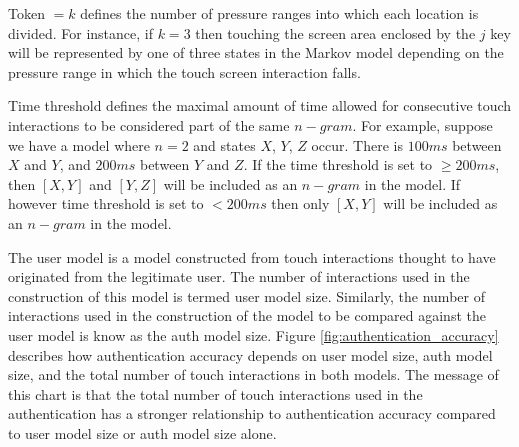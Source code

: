 
Token $= k$ defines the number of pressure ranges
into which each location is divided.
%
For instance,
if $k = 3$ 
then touching the screen area enclosed by
the $j$ key will be represented by one of three states
in the Markov model depending on the
pressure range in which the touch screen interaction falls.
% 

Time threshold defines the maximal amount of time
allowed for consecutive touch interactions 
to be considered part of the same $n-gram$.
% 
For example,
suppose we have a model where $n = 2$ and
states $X$, $Y$, $Z$ occur.
There is $100ms$ between $X$ and $Y$, and
$200ms$ between $Y$ and $Z$.
If the time threshold is set to
$\geq 200 ms$, 
then $[X,Y]$ and $[Y,Z]$ will be included as an $n-gram$ in the model.
If however time threshold is set to $< 200 ms$
then only $[X,Y]$ will be included as an $n-gram$ in the model.
%

The user model is a model constructed from 
touch interactions thought to have originated from
the legitimate user.
The number of interactions used in the construction of this model
is termed user model size.
Similarly,
the number of interactions used in the construction of
the model to be compared against the user model
is know as the auth model size.
%
Figure \ref{fig:authentication_accuracy}
describes how authentication accuracy depends on 
user model size, auth model size, and 
the total number of touch interactions in both models.
%
The message of this chart is that
the total number of touch interactions used in the authentication
has a stronger relationship to
authentication accuracy compared to
user model size or auth model size alone.


